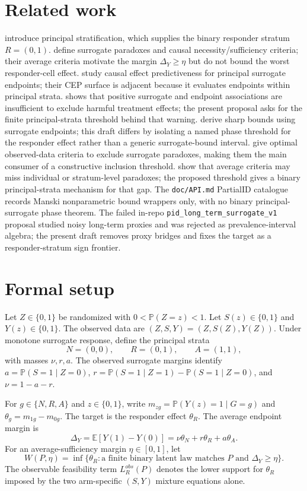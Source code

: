 \documentclass[11pt]{article}
\newcommand{\E}{\mathbb{E}}
\renewcommand{\Pr}{\mathbb{P}}
\theoremstyle{definition}
\theoremstyle{plain}
\theoremstyle{remark}
\begin{document}
\section{Related work}
\citet{FrangakisRubin2002} introduce principal stratification, which supplies the binary responder stratum \(R=(0,1)\).  \citet{ChenGengJia2007} define surrogate paradoxes and causal necessity/sufficiency criteria; their average criteria motivate the margin \(\Delta_Y\ge\eta\) but do not bound the worst responder-cell effect.  \citet{GilbertHudgens2008} study causal effect predictiveness for principal surrogate endpoints; their CEP surface is adjacent because it evaluates endpoints within principal strata.  \citet{VanderWeele2013} shows that positive surrogate and endpoint associations are insufficient to exclude harmful treatment effects; the present proposal asks for the finite principal-strata threshold behind that warning.  \citet{KurokiCai2013} derive sharp bounds using surrogate endpoints; this draft differs by isolating a named phase threshold for the responder effect rather than a generic surrogate-bound interval.  \citet{YinLiuGengLuo2019} give optimal observed-data criteria to exclude surrogate paradoxes, making them the main consumer of a constructive inclusion threshold.  \citet{MaYinLiuGeng2021} show that average criteria may miss individual or stratum-level paradoxes; the proposed threshold gives a binary principal-strata mechanism for that gap.  The \texttt{doc/API.md} PartialID catalogue records Manski nonparametric bound wrappers only, with no binary principal-surrogate phase theorem.  The failed in-repo \texttt{pid\_long\_term\_surrogate\_v1} proposal studied noisy long-term proxies and was rejected as prevalence-interval algebra; the present draft removes proxy bridges and fixes the target as a responder-stratum sign frontier.

\section{Formal setup}
Let \(Z\in\{0,1\}\) be randomized with \(0<\Pr(Z=z)<1\).  Let \(S(z)\in\{0,1\}\) and \(Y(z)\in\{0,1\}\).  The observed data are \((Z,S,Y)=(Z,S(Z),Y(Z))\).  Under monotone surrogate response, define the principal strata
\[
  N=(0,0),\qquad R=(0,1),\qquad A=(1,1),
\]
with masses \(\nu,r,a\).  The observed surrogate margins identify \(a=\Pr(S=1\mid Z=0)\), \(r=\Pr(S=1\mid Z=1)-\Pr(S=1\mid Z=0)\), and \(\nu=1-a-r\).

For \(g\in\{N,R,A\}\) and \(z\in\{0,1\}\), write \(m_{zg}=\Pr(Y(z)=1\mid G=g)\) and \(\theta_g=m_{1g}-m_{0g}\).  The target is the responder effect \(\theta_R\).  The average endpoint margin is
\[
  \Delta_Y=\E[Y(1)-Y(0)]=\nu\theta_N+r\theta_R+a\theta_A.
\]
For an average-sufficiency margin \(\eta\in[0,1]\), let
\[
  W(P,\eta)=\inf\{\theta_R:\text{a finite binary latent law matches }P
    \text{ and }\Delta_Y\ge\eta\}.
\]
The observable feasibility term \(L_R^{obs}(P)\) denotes the lower support for \(\theta_R\) imposed by the two arm-specific \((S,Y)\) mixture equations alone.
\end{document}
